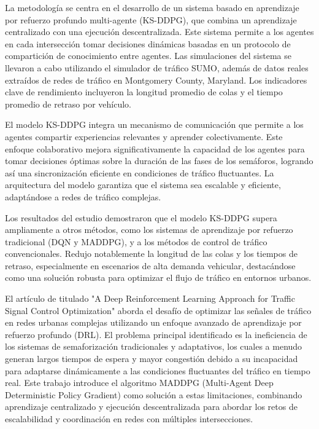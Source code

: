 La metodología se centra en el desarrollo de un sistema basado en aprendizaje por refuerzo profundo multi-agente (KS-DDPG), que combina un aprendizaje centralizado con una ejecución descentralizada. Este sistema permite a los agentes en cada intersección tomar decisiones dinámicas basadas en un protocolo de compartición de conocimiento entre agentes. Las simulaciones del sistema se llevaron a cabo utilizando el simulador de tráfico SUMO, además de datos reales extraídos de redes de tráfico en Montgomery County, Maryland. Los indicadores clave de rendimiento incluyeron la longitud promedio de colas y el tiempo promedio de retraso por vehículo.

El modelo KS-DDPG integra un mecanismo de comunicación que permite a los agentes compartir experiencias relevantes y aprender colectivamente. Este enfoque colaborativo mejora significativamente la capacidad de los agentes para tomar decisiones óptimas sobre la duración de las fases de los semáforos, logrando así una sincronización eficiente en condiciones de tráfico fluctuantes. La arquitectura del modelo garantiza que el sistema sea escalable y eficiente, adaptándose a redes de tráfico complejas.

Los resultados del estudio demostraron que el modelo KS-DDPG supera ampliamente a otros métodos, como los sistemas de aprendizaje por refuerzo tradicional (DQN y MADDPG), y a los métodos de control de tráfico convencionales. Redujo notablemente la longitud de las colas y los tiempos de retraso, especialmente en escenarios de alta demanda vehicular, destacándose como una solución robusta para optimizar el flujo de tráfico en entornos urbanos.

El artículo de \cite{Li2021a} titulado "A Deep Reinforcement Learning Approach for Traffic Signal Control Optimization" aborda el desafío de optimizar las señales de tráfico en redes urbanas complejas utilizando un enfoque avanzado de aprendizaje por refuerzo profundo (DRL). El problema principal identificado es la ineficiencia de los sistemas de semaforización tradicionales y adaptativos, los cuales a menudo generan largos tiempos de espera y mayor congestión debido a su incapacidad para adaptarse dinámicamente a las condiciones fluctuantes del tráfico en tiempo real. Este trabajo introduce el algoritmo MADDPG (Multi-Agent Deep Deterministic Policy Gradient) como solución a estas limitaciones, combinando aprendizaje centralizado y ejecución descentralizada para abordar los retos de escalabilidad y coordinación en redes con múltiples intersecciones.

